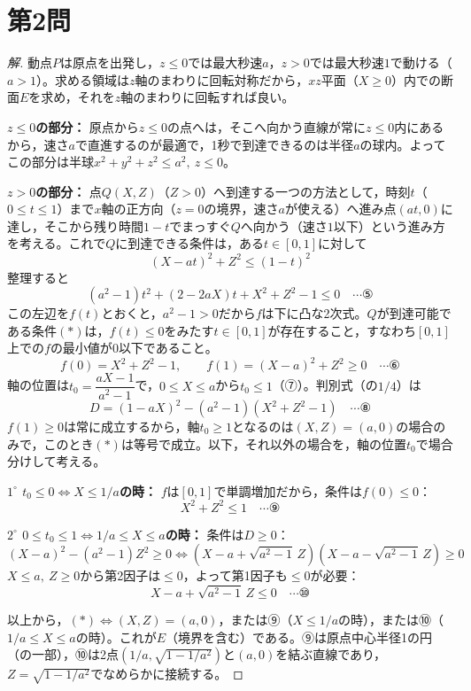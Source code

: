 \documentclass[../main.tex]{subfiles}
\begin{document}
\newpage

\section*{第2問}

\begin{proof}[解]
  動点$P$は原点を出発し，$z\le0$では最大秒速$a$，$z>0$では最大秒速$1$で動ける（$a>1$）。求める領域は$z$軸のまわりに回転対称だから，$xz$平面（$X\ge0$）内での断面$E$を求め，それを$z$軸のまわりに回転すれば良い。

  \textbf{$z\le0$の部分：} 原点から$z\le0$の点へは，そこへ向かう直線が常に$z\le0$内にあるから，速さ$a$で直進するのが最適で，1秒で到達できるのは半径$a$の球内。よってこの部分は半球$x^2+y^2+z^2\le a^2,\ z\le0$。

  \textbf{$z>0$の部分：} 点$Q(X,Z)$（$Z>0$）へ到達する一つの方法として，時刻$t$（$0\le t\le1$）まで$x$軸の正方向（$z=0$の境界，速さ$a$が使える）へ進み点$(at,0)$に達し，そこから残り時間$1-t$でまっすぐ$Q$へ向かう（速さ$1$以下）という進み方を考える。これで$Q$に到達できる条件は，ある$t\in[0,1]$に対して
  \[
    (X-at)^2+Z^2\le(1-t)^2
  \]
  整理すると
  \[
    (a^2-1)t^2+(2-2aX)t+X^2+Z^2-1\le0 \quad\cdots\text{⑤}
  \]
  この左辺を$f(t)$とおくと，$a^2-1>0$だから$f$は下に凸な2次式。$Q$が到達可能である条件$(\ast)$は，$f(t)\le0$をみたす$t\in[0,1]$が存在すること，すなわち$[0,1]$上での$f$の最小値が$0$以下であること。
  \[
    f(0)=X^2+Z^2-1,\qquad f(1)=(X-a)^2+Z^2\ge0 \quad\cdots\text{⑥}
  \]
  軸の位置は$t_0=\dfrac{aX-1}{a^2-1}$で，$0\le X\le a$から$t_0\le1$（⑦）。判別式（の$1/4$）は
  \[
    D=(1-aX)^2-(a^2-1)(X^2+Z^2-1) \quad\cdots\text{⑧}
  \]
  $f(1)\ge0$は常に成立するから，軸$t_0\ge1$となるのは$(X,Z)=(a,0)$の場合のみで，このとき$(\ast)$は等号で成立。以下，それ以外の場合を，軸の位置$t_0$で場合分けして考える。

  \textbf{$1^\circ$ $t_0\le0\iff X\le1/a$の時：} $f$は$[0,1]$で単調増加だから，条件は$f(0)\le0$：
  \[
    X^2+Z^2\le1 \quad\cdots\text{⑨}
  \]

  \textbf{$2^\circ$ $0\le t_0\le1\iff1/a\le X\le a$の時：} 条件は$D\ge0$：
  \[
    (X-a)^2-(a^2-1)Z^2\ge0 \iff \left(X-a+\sqrt{a^2-1}\,Z\right)\left(X-a-\sqrt{a^2-1}\,Z\right)\ge0
  \]
  $X\le a,\ Z\ge0$から第2因子は$\le0$，よって第1因子も$\le0$が必要：
  \[
    X-a+\sqrt{a^2-1}\,Z\le0 \quad\cdots\text{⑩}
  \]

  以上から，$(\ast)\iff(X,Z)=(a,0)$，または⑨（$X\le1/a$の時），または⑩（$1/a\le X\le a$の時）。これが$E$（境界を含む）である。⑨は原点中心半径1の円（の一部），⑩は2点$(1/a,\sqrt{1-1/a^2})$と$(a,0)$を結ぶ直線であり，$Z=\sqrt{1-1/a^2}$でなめらかに接続する。


\end{proof}
\end{document}
